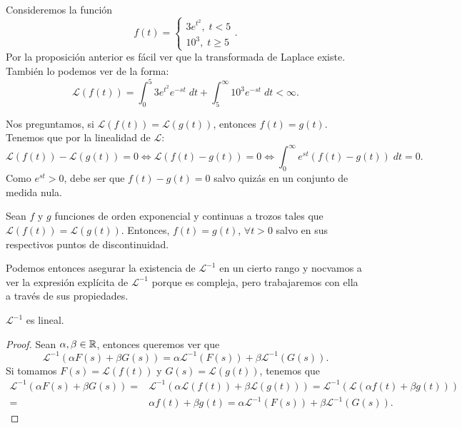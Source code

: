 \begin{eg}
Consideremos la función 
\[f\left(t\right)=
\begin{cases}
3e^{t ^{2}}, \; t < 5 \\
10^{3}, \; t \geq 5
\end{cases}
.\]
Por la proposición anterior es fácil ver que la transformada de Laplace existe. También lo podemos ver de la forma:
\[\mathcal{L}\left(f\left(t\right)\right)=\int^{5}_{0} 3e^{t ^{2}}e^{-st} \; dt + \int^{\infty}_{5} 10^{3}e^{-st} \; dt < \infty .\]
\end{eg}
\begin{observation}
Nos preguntamos, si $\displaystyle \mathcal{L}\left(f\left(t\right)\right)=\mathcal{L}\left(g\left(t\right)\right) $, entonces $\displaystyle f\left(t\right) = g\left(t\right) $. Tenemos que por la linealidad de $\displaystyle \mathcal{L} $:
\[\mathcal{L}\left(f\left(t\right)\right)-\mathcal{L}\left(g\left(t\right)\right)=0 \iff \mathcal{L}\left(f\left(t\right)-g\left(t\right)\right)=0 \iff \int^{\infty}_{0} e^{st}\left(f\left(t\right)-g\left(t\right)\right) \; dt = 0 .\]
Como $\displaystyle e^{st} > 0 $, debe ser que $\displaystyle f\left(t\right)-g\left(t\right)=0 $ salvo quizás en un conjunto de medida nula.
\end{observation}
\begin{theorem}
Sean $\displaystyle f $ y $\displaystyle g $ funciones de orden exponencial y continuas a trozos tales que $\displaystyle \mathcal{L}\left(f\left(t\right)\right)=\mathcal{L}\left(g\left(t\right)\right) $. Entonces, $\displaystyle f\left(t\right)=g\left(t\right) $, $\displaystyle \forall t > 0 $ salvo en sus respectivos puntos de discontinuidad.
\end{theorem}
Podemos entonces asegurar la existencia de $\displaystyle \mathcal{L}^{-1} $ en un cierto rango y nocvamos a ver la expresión explícita de $\displaystyle \mathcal{L}^{-1} $ porque es compleja, pero trabajaremos con ella a través de sus propiedades.
\begin{prop}
$\displaystyle \mathcal{L}^{-1} $ es lineal.
\end{prop}
\begin{proof}
Sean $\displaystyle \alpha, \beta \in \mathbb{R} $, entonces queremos ver que
\[
	\mathcal{L}^{-1}\left(\alpha F\left(s\right)+\beta G\left(s\right)\right)=  \alpha\mathcal{L}^{-1}\left(F\left(s\right)\right) + \beta\mathcal{L}^{-1}\left(G\left(s\right)\right).
\]
Si tomamos $\displaystyle F\left(s\right)=\mathcal{L}\left(f\left(t\right)\right) $ y $\displaystyle G\left(s\right)=\mathcal{L}\left(g\left(t\right)\right) $, tenemos que 
\[
\begin{split}
	\mathcal{L}^{-1}\left(\alpha F\left(s\right)+\beta G\left(s\right)\right)=& \mathcal{L}^{-1}\left(\alpha\mathcal{L}\left(f\left(t\right)\right)+\beta\mathcal{L}\left(g\left(t\right)\right)\right) = \mathcal{L}^{-1}\left(\mathcal{L}\left(\alpha f\left(t\right)+\beta g\left(t\right)\right)\right) \\
	= & \alpha f\left(t\right)+\beta g\left(t\right) = \alpha \mathcal{L}^{-1}\left(F\left(s\right)\right)+\beta \mathcal{L}^{-1}\left(G\left(s\right)\right) .
\end{split}
\]
\end{proof}
